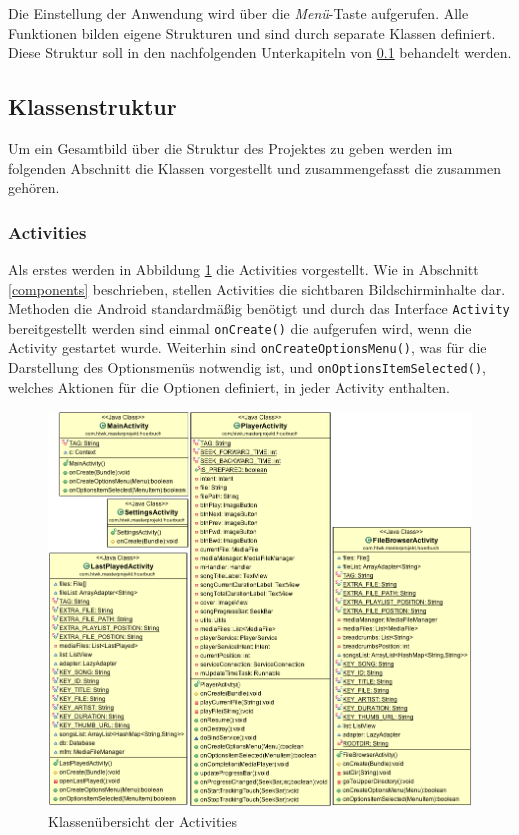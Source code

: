 Die Einstellung der Anwendung wird über die \textit{Menü}-Taste aufgerufen. Alle Funktionen bilden eigene Strukturen und sind durch separate Klassen definiert. Diese Struktur soll in den nachfolgenden Unterkapiteln von \ref{classes} behandelt werden.

\subsection{Klassenstruktur}
\label{classes}
Um ein Gesamtbild über die Struktur des Projektes zu geben werden im folgenden Abschnitt die Klassen vorgestellt und zusammengefasst die zusammen gehören.

\subsubsection{Activities}

Als erstes werden in Abbildung \ref{cd_activities} die Activities vorgestellt. Wie in Abschnitt \ref{components} beschrieben, stellen Activities die sichtbaren Bildschirminhalte dar. Methoden die Android standardmäßig benötigt und durch das Interface \verb+Activity+ bereitgestellt werden sind einmal \verb+onCreate()+ die aufgerufen wird, wenn die Activity gestartet wurde. Weiterhin sind \verb+onCreateOptionsMenu()+, was für die Darstellung des Optionsmenüs notwendig ist, und \verb+onOptionsItemSelected()+, welches Aktionen für die Optionen definiert, in jeder Activity enthalten.

\begin{figure}[ht!]
\begin{center}
\includegraphics[scale=.5]{images/diagram}
\caption{Klassenübersicht der Activities}
\label{cd_activities}
\end{center}
\end{figure}

